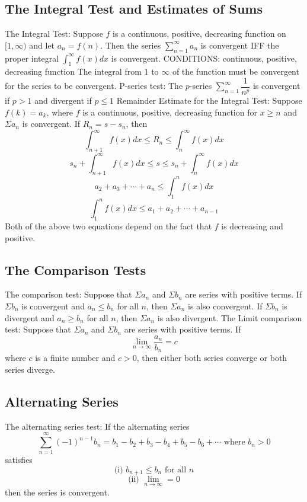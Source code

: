 \documentclass{article}
\begin{document}
    \subsection{The Integral Test and Estimates of Sums}
    \begin{outline}
        \1 The Integral Test: Suppose $f$ is a continuous, positive, decreasing function on \([1,\infty)\) and let \(a_n=f(n)\). Then the series \(\sum^\infty_{n=1}a_n\) is convergent IFF the proper integral \(\int^\infty_1f(x)dx\) is convergent. 
            \2 CONDITIONS: continuous, positive, decreasing function 
            \2 The integral from $1$ to $\infty$ of the function must be convergent for the series to be convergent. 
        \1 P-series test: The $p$-series \(\sum^\infty_{n=1}\dfrac{1}{n^p}\) is convergent if \(p>1\) and divergent if \(p\leq1\)
        \1 Remainder Estimate for the Integral Test: Suppose \(f(k)=a_k\), where $f$ is a continuous, positive, decreasing function for \(x\geq n\) and \(\Sigma a_n\) is convergent. If \(R_n=s-s_n\), then \[\int^\infty_{n+1}f(x)dx\leq R_n\leq\int^\infty_n f(x)dx\]
        \1 \[s_n+\int^\infty_{n+1}f(x)dx\leq s\leq s_n+\int^\infty_nf(x)dx\]
        \1 \[a_2+a_3+\cdots+a_n\leq\int^n_1f(x)dx\]
        \1 \[\int^n_1f(x)dx\leq a_1+a_2+\cdots+a_{n-1}\]
            \2 Both of the above two equations depend on the fact that $f$ is decreasing and positive. 
    \end{outline}
    \subsection{The Comparison Tests}
    \begin{outline}
        \1 The comparison test: Suppose that \(\Sigma a_n\) and \(\Sigma b_n\) are series with positive terms. 
            \2 If \(\Sigma b_n\) is convergent and \(a_n\leq b_n\) for all $n$, then \(\Sigma a_n\) is also convergent. 
            \2 If \(\Sigma b_n\) is divergent and \(a_n\geq b_n\) for all $n$, then \(\Sigma a_n\) is also divergent. 
        \1 The Limit comparison test: Suppose that \(\Sigma a_n\) and \(\Sigma b_n\) are series with positive terms. If \[\lim_{n\to\infty}\dfrac{a_n}{b_n}=c\] where $c$ is a finite number and \(c>0\), then either both series converge or both series diverge. 

    \end{outline}
    \subsection{Alternating Series}
    \begin{outline}
        \1 The alternating series test: If the alternating series \[\sum^\infty_{n=1}(-1)^{n-1}b_n=b_1-b_2+b_3-b_4+b_5-b_6+\cdots \mbox{ where } b_n>0\] satisfies \[\mbox{(i) }b_{n+1}\leq b_n\mbox{ for all }n\]\[\mbox{(ii) }\lim_{n\to\infty}=0\] then the series is convergent. 
    \end{outline}
    
\end{document}
